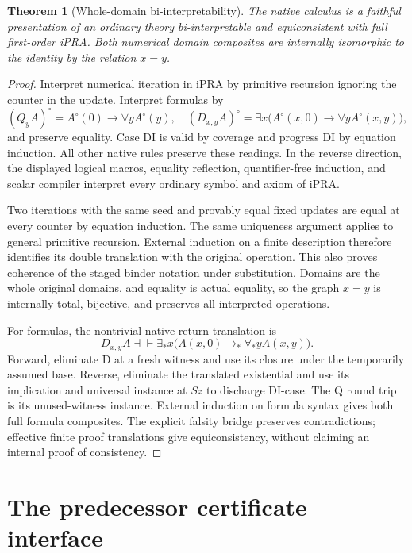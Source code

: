 \documentclass[11pt,letterpaper]{article}
\newtheorem{theorem}{Theorem}[section]
\theoremstyle{definition}\newtheorem{definition}[theorem]{Definition}
\theoremstyle{remark}\newtheorem{remark}[theorem]{Remark}
\begin{document}
\begin{theorem}[Whole-domain bi-interpretability]
\label{up:biinterpretability}
The native calculus is a faithful presentation of an ordinary theory
bi-interpretable and equiconsistent with full first-order iPRA. Both
numerical domain composites are internally isomorphic to the identity by
the relation $x=y$.
\end{theorem}
\begin{proof}
Interpret numerical iteration in iPRA by primitive recursion ignoring the
counter in the update. Interpret formulas by
\[
 (Q_yA)^\circ=A^\circ(0)\to\forall y A^\circ(y),\quad
 (D_{x,y}A)^\circ=\exists x\bigl(A^\circ(x,0)\to\forall yA^\circ(x,y)\bigr),
\]
and preserve equality. Case DI is valid by coverage and progress DI by
equation induction. All other native rules preserve these readings.
In the reverse direction, the displayed logical macros, equality
reflection, quantifier-free induction, and scalar compiler interpret every
ordinary symbol and axiom of iPRA.

Two iterations with the same seed and provably equal fixed updates are
equal at every counter by equation induction. The same uniqueness argument
applies to general primitive recursion. External induction on a finite
description therefore identifies its double translation with the original
operation. This also proves coherence of the staged binder notation under
substitution. Domains are the whole original domains, and equality is
actual equality, so the graph $x=y$ is internally total, bijective, and
preserves all interpreted operations.

For formulas, the nontrivial native return translation is
\[
 D_{x,y}A\dashv\vdash
 \exists_*x\bigl(A(x,0)\to_*\forall_*y A(x,y)\bigr).
\]
Forward, eliminate D at a fresh witness and use its closure under the
temporarily assumed base. Reverse, eliminate the translated existential
and use its implication and universal instance at $Sz$ to discharge
DI-case. The Q round trip is its unused-witness instance. External induction
on formula syntax gives both full formula composites. The explicit falsity
bridge preserves contradictions; effective finite proof translations give
equiconsistency, without claiming an internal proof of consistency.
\end{proof}

\section{The predecessor certificate interface}
\label{sec:certificate-interface}
\end{document}
